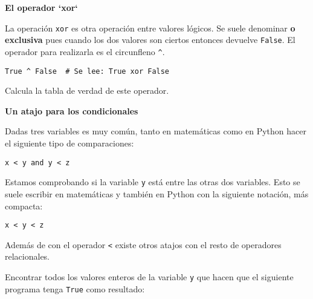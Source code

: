 \documentclass[a4paper, 11pt]{scrartcl}
\newenvironment{code}{\begin{tcolorbox}[colback=red!2!white]}{\end{tcolorbox}}
\begin{document}
\noindent\textbf{\sffamily El operador `xor`}

La operación \verb|xor| es otra operación entre valores lógicos. Se suele denominar \textbf{o exclusiva}   pues cuando los dos valores son ciertos entonces devuelve \verb|False|. El operador para realizarla es el circunfleno \verb|^|.

\smallskip

\begin{code}

\begin{verbatim}
True ^ False  # Se lee: True xor False
\end{verbatim}

\end{code}

Calcula la tabla de verdad de este operador.







\noindent\textbf{\sffamily \dag{} Un atajo para los condicionales}

Dadas tres variables es muy común, tanto en matemáticas como en Python hacer el siguiente tipo de comparaciones:

\smallskip

\begin{code}

\begin{verbatim}
x < y and y < z
\end{verbatim}

\end{code}

Estamos comprobando si la variable \verb|y| está entre las otras dos variables. Esto se suele escribir en matemáticas y también en Python con la siguiente notación, más compacta:

\smallskip

\begin{code}

\begin{verbatim}
x < y < z
\end{verbatim}

\end{code}

Además de con el operador \verb|<| existe otros atajos con el resto de operadores relacionales.

Encontrar todos los valores enteros de la variable \verb|y| que hacen que el siguiente programa tenga \verb|True| como resultado:
\end{document}
